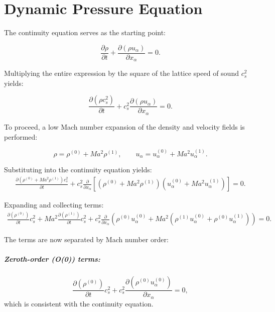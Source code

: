 \chapter{Dynamic Pressure Equation}
\label{appendix:2ndOrderMoments}

The continuity equation serves as the starting point:

\begin{equation}
\frac{\partial \rho}{\partial t} + \frac{\partial (\rho u_\alpha)}{\partial x_\alpha} = 0.
\end{equation}

Multiplying the entire expression by the square of the lattice speed of sound \(c_s^2\) yields:

\begin{equation}
\frac{\partial (\rho c_s^2)}{\partial t} + c_s^2 \frac{\partial (\rho u_\alpha)}{\partial x_\alpha} = 0.
\end{equation}

To proceed, a low Mach number expansion of the density and velocity fields is performed:

\begin{equation}
\rho = \rho^{(0)} + M\!a^2 \rho^{(1)}, \qquad u_\alpha = u_\alpha^{(0)} + M\!a^2 u_\alpha^{(1)}.
\end{equation}

Substituting into the continuity equation yields:
\begin{align}
\frac{\partial\left( \rho^{(0)} + M\!a^2 \rho^{(1)} \right)c_s^2}{\partial t} 
+ c_s^2 \frac{\partial}{\partial x_\alpha}\left[ \left( \rho^{(0)} + M\!a^2 \rho^{(1)} \right)\left( u_\alpha^{(0)} + M\!a^2 u_\alpha^{(1)} \right) \right] = 0.
\end{align}

Expanding and collecting terms:
\begin{align}
\frac{\partial (\rho^{(0)})}{\partial t}  c_s^2
+ M\!a^2 \frac{\partial(\rho^{(1)})}{\partial t} c_s^2 
+ c_s^2 \frac{\partial}{\partial x_\alpha} \left( \rho^{(0)} u_\alpha^{(0)} 
+ M\!a^2 \left( \rho^{(1)} u_\alpha^{(0)} + \rho^{(0)} u_\alpha^{(1)} \right) \right) = 0.
\end{align}

The terms are now separated by Mach number order:

\paragraph{Zeroth-order (O(0)) terms:}
\begin{equation}
\frac{\partial(\rho^{(0)})}{\partial t} c_s^2 + c_s^2 \frac{\partial (\rho^{(0)} u_\alpha^{(0)})}{\partial x_\alpha} = 0,
\end{equation}
which is consistent with the continuity equation.

